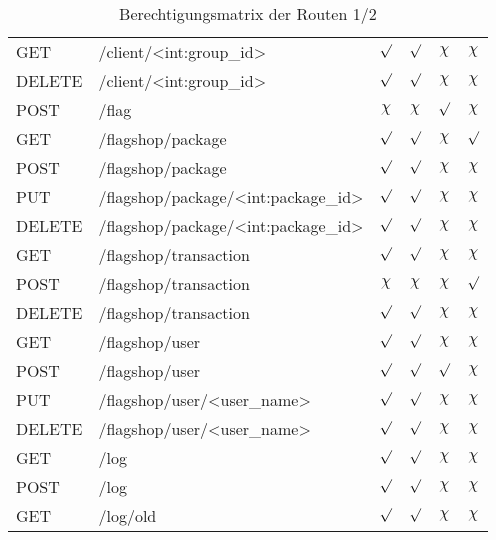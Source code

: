 \begin{table}
\begin{tabular}{l l c c c c}
		GET 	& /client/<int:group\_id>			& $\surd$ & $\surd$ & $\chi$ & $\chi$ \\
		DELETE	& /client/<int:group\_id>			& $\surd$ & $\surd$ & $\chi$ & $\chi$ \\
		POST 	& /flag								& $\chi$ & $\chi$ & $\surd$ & $\chi$ \\
		GET		& /flagshop/package					& $\surd$ & $\surd$ & $\chi$ & $\surd$ \\
		POST	& /flagshop/package					& $\surd$ & $\surd$ & $\chi$ & $\chi$ \\
		PUT 	&/flagshop/package/<int:package\_id>& $\surd$ & $\surd$ & $\chi$ & $\chi$ \\
		DELETE	&/flagshop/package/<int:package\_id>& $\surd$ & $\surd$ & $\chi$ & $\chi$ \\
		GET		& /flagshop/transaction				& $\surd$ & $\surd$ & $\chi$ & $\chi$ \\
		POST	& /flagshop/transaction				& $\chi$ & $\chi$ & $\chi$ & $\surd$ \\
		DELETE	& /flagshop/transaction				& $\surd$ & $\surd$ & $\chi$ & $\chi$ \\
		GET		& /flagshop/user					& $\surd$ & $\surd$ & $\chi$ & $\chi$ \\
		POST	& /flagshop/user					& $\surd$ & $\surd$ & $\surd$ & $\chi$ \\
		PUT		& /flagshop/user/<user\_name>		& $\surd$ & $\surd$ & $\chi$ & $\chi$ \\
		DELETE	& /flagshop/user/<user\_name>		& $\surd$ & $\surd$ & $\chi$ & $\chi$ \\
		GET 	& /log								& $\surd$ & $\surd$ & $\chi$ & $\chi$ \\
		POST 	& /log								& $\surd$ & $\surd$ & $\chi$ & $\chi$ \\
		GET		& /log/old							& $\surd$ & $\surd$ & $\chi$ & $\chi$ \\
	\end{tabular}
\caption{Berechtigungsmatrix der Routen 1/2}
\label{table:gis-permission-1}
\end{table}

